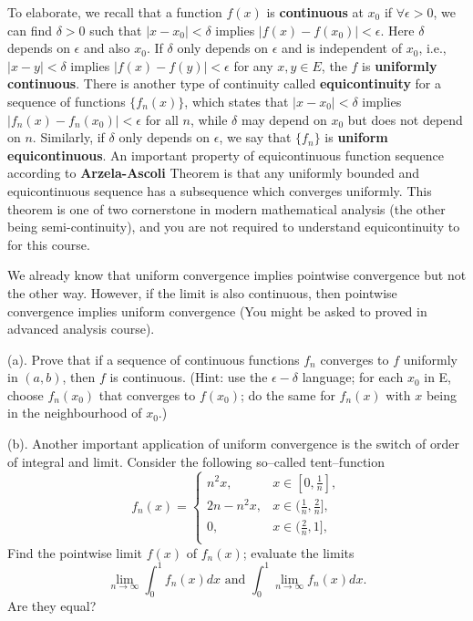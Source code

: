 \documentclass[6pt]{article}
\numberwithin{equation}{section}
\begin{document}
\begin{enumerate}
To elaborate, we recall that a function $f(x)$ is \textbf{continuous} at $x_0$ if $\forall \epsilon>0$, we can find $\delta>0$ such that $\vert x-x_0\vert<\delta$ implies $\vert f(x)-f(x_0) \vert<\epsilon$.  Here $\delta$ depends on $\epsilon$ and also $x_0$.  If $\delta$ only depends on $\epsilon$ and is independent of $x_0$, i.e., $\vert x-y\vert<\delta$ implies $\vert f(x)-f(y) \vert<\epsilon$ for any $x,y\in E$, the $f$ is \textbf{uniformly continuous}.  There is another type of continuity called \textbf{equicontinuity} for a sequence of functions $\{f_n(x)\}$, which states that $\vert x-x_0\vert<\delta$ implies $\vert f_n(x)-f_n(x_0) \vert<\epsilon$ for all $n$, while $\delta$ may depend on $x_0$ but does not depend on $n$.  Similarly, if $\delta$ only depends on $\epsilon$, we say that $\{f_n\}$ is \textbf{uniform equicontinuous}.  An important property of equicontinuous function sequence according to \textbf{Arzela-Ascoli} Theorem is that any uniformly bounded and equicontinuous sequence has a subsequence which converges uniformly.  This theorem is one of two cornerstone in modern mathematical analysis (the other being semi-continuity), and you are not required to understand equicontinuity to for this course.

We already know that uniform convergence implies pointwise convergence but not the other way.  However, if the limit is also continuous, then pointwise convergence implies uniform convergence (You might be asked to proved in advanced analysis course).

(a).  Prove that if a sequence of continuous functions $f_n$ converges to $f$ uniformly in $(a,b)$, then $f$ is continuous.  (Hint: use the $\epsilon-\delta$ language; for each $x_0$ in E, choose $f_n(x_0)$ that converges to $f(x_0)$; do the same for $f_n(x)$ with $x$ being in the neighbourhood of $x_0$.)

(b).  Another important application of uniform convergence is the switch of order of integral and limit.  Consider the following so--called tent--function
\begin{equation}f_n(x)=
\left\{
\begin{array}{ll}
n^2x,& x\in[0,\frac{1}{n}],\\
2n-n^2x,& x\in(\frac{1}{n},\frac{2}{n}],\\
0,& x\in(\frac{2}{n},1],\\
\end{array}
\right.
\end{equation}
Find the pointwise limit $f(x)$ of $f_n(x)$;  evaluate the limits \[\lim_{n\rightarrow \infty} \int_0^1 f_n(x)dx \text{ and }\int_0^1 \lim_{n\rightarrow \infty} f_n(x)dx.\]  Are they equal?


\end{enumerate}
\end{document}
